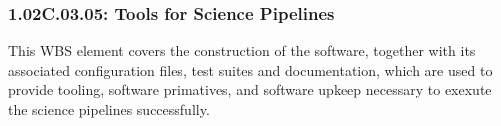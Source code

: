 \subsubsection{1.02C.03.05: Tools for Science Pipelines}

This WBS element covers the construction of the software, together with its
associated configuration files, test suites and documentation, which are used
to provide tooling, software primatives, and software upkeep necessary to exexute
the science pipelines successfully.
